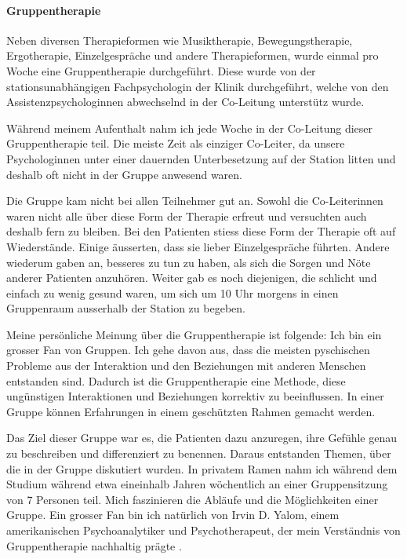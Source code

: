 \paragraph{Gruppentherapie}
Neben diversen Therapieformen wie Musiktherapie, Bewegungstherapie, Ergotherapie, Einzelgespräche und andere Therapieformen, wurde einmal pro Woche eine Gruppentherapie durchgeführt. Diese wurde von der stationsunabhängigen Fachpsychologin der Klinik durchgeführt, welche von den Assistenzpsychologinnen abwechselnd in der Co-Leitung unterstütz wurde. 

Während meinem Aufenthalt nahm ich jede Woche in der Co-Leitung dieser Gruppentherapie teil. Die meiste Zeit als einziger Co-Leiter, da unsere Psychologinnen unter einer dauernden Unterbesetzung auf der Station litten und deshalb oft nicht in der Gruppe anwesend waren. 

Die Gruppe kam nicht bei allen Teilnehmer gut an. Sowohl die Co-Leiterinnen waren nicht alle über diese Form der Therapie erfreut und versuchten auch deshalb fern zu bleiben. Bei den Patienten stiess diese Form der Therapie oft auf Wiederstände. Einige äusserten, dass sie lieber Einzelgespräche führten. Andere wiederum gaben an, besseres zu tun zu haben, als sich die Sorgen und Nöte anderer Patienten anzuhören. Weiter gab es noch diejenigen, die schlicht und einfach zu wenig gesund waren, um sich um 10 Uhr morgens in einen Gruppenraum ausserhalb der Station zu begeben.

Meine persönliche Meinung über die Gruppentherapie ist folgende: Ich bin ein grosser Fan von Gruppen. Ich gehe davon aus, dass die meisten pyschischen Probleme aus der Interaktion und den Beziehungen mit anderen Menschen entstanden sind. Dadurch ist die Gruppentherapie eine Methode, diese ungünstigen Interaktionen und Beziehungen korrektiv zu beeinflussen. In einer Gruppe können Erfahrungen in einem geschützten Rahmen gemacht werden.

Das Ziel dieser Gruppe war es, die Patienten dazu anzuregen, ihre Gefühle genau zu beschreiben und differenziert zu benennen. Daraus entstanden Themen, über die in der Gruppe diskutiert wurden. In privatem Ramen nahm ich während dem Studium während etwa eineinhalb Jahren wöchentlich an einer Gruppensitzung von 7 Personen teil. Mich faszinieren die Abläufe und die Möglichkeiten einer Gruppe. Ein grosser Fan bin ich natürlich von Irvin D. Yalom, einem amerikanischen Psychoanalytiker und Psychotherapeut, der mein Verständnis von Gruppentherapie nachhaltig prägte \cite{Yalom2010}.

